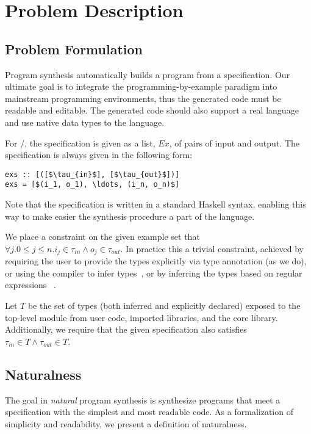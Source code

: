 \section{Problem Description}
\label{problem}

\subsection{Problem Formulation}


Program synthesis automatically builds a program from a specification.
Our ultimate goal is to integrate the programming-by-example paradigm 
into mainstream programming environments, thus the generated code must be readable and editable. The generated code should also support a real language and use native data types to the language.

For \ourTool/, the specification is given as a list, $Ex$, of pairs of input and output. The specification is always given in the following 
form:
\begin{lstlisting}[mathescape=true]
exs :: [([$\tau_{in}$], [$\tau_{out}$])]
exs = [$(i_1, o_1), \ldots, (i_n, o_n)$]
\end{lstlisting}


Note that the specification is written in a standard Haskell syntax, enabling this way to make easier the synthesis procedure a part of the language.

We place a constraint on the given example set that $\forall j. 0 \le j \le n. i_j \in \tau_{in} \land o_j \in \tau_{out}$. In practice this a trivial constraint, achieved by requiring the user to provide the types explicitly via type annotation (as we do), or using the compiler to infer types~\cite{ghc}, or by inferring the types based on regular expressions~\cite{gulwani_popl15} .

Let $T$ be the set of types (both inferred and explicitly declared) exposed to the top-level module from user code, imported libraries, and the core library. Additionally, we require that the given specification also satisfies $\tau_{in} \in T \land
\tau_{out} \in T$.



\subsection{Naturalness}
\label{sec:naturalness}

The goal in \textit{natural} program synthesis is synthesize programs that meet a specification with the simplest and most readable code.
As a formalization of simplicity and readability, we present a definition of naturalness.

